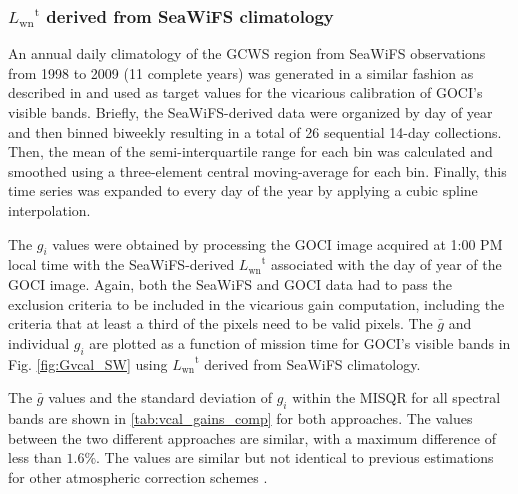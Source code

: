 \documentclass[]{interact}
\theoremstyle{plain}%
\theoremstyle{definition}
\theoremstyle{remark}
\begin{document}
\subsubsection{${L_\text{wn}}^\text{t}$ derived from SeaWiFS climatology}
An annual daily climatology of the GCWS region from SeaWiFS observations from 1998 to 2009 (11 complete years) was generated in a similar fashion as described in \citep{Werdell:07} and used as target values for the vicarious calibration of GOCI's visible bands. Briefly, the SeaWiFS-derived data were organized by day of year and then binned biweekly resulting in a total of 26 sequential 14-day collections. Then, the mean of the semi-interquartile range for each bin was calculated and smoothed using a three-element central moving-average for each bin. Finally, this time series was expanded to every day of the year by applying a cubic spline interpolation. 

The $g_i$ values were obtained by processing the GOCI image acquired at 1:00 PM local time with the SeaWiFS-derived ${L_\text{wn}}^\text{t}$ associated with the day of year of the GOCI image. Again, both the SeaWiFS and GOCI data had to pass the exclusion criteria to be included in the vicarious gain computation, including the criteria that at least a third of the pixels need to be valid pixels. The $\bar{g}$ and individual $g_i$ are plotted as a function of mission time for GOCI's visible bands in Fig. \ref{fig:Gvcal_SW} using ${L_\text{wn}}^\text{t}$ derived from SeaWiFS climatology.

The $\bar{g}$ values and the standard deviation of $g_i$ within the MISQR for all spectral bands are shown in \autoref{tab:vcal_gains_comp} for both approaches. The values between the two different approaches are similar, with a maximum difference of less than $1.6\%$. The values are similar but not identical to previous estimations for other atmospheric correction schemes \citep{Wang:13,Ahn2015}. 
\end{document}
